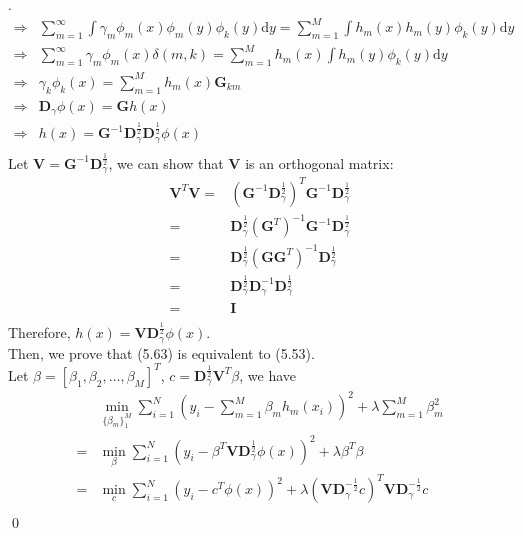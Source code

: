 \documentclass[12pt]{article}
\newenvironment{sol}
  {\par\vspace{3mm}\noindent{\it Solution}.}
  {\qed}
\begin{document}
\begin{sol}
\begin{equation*}
\begin{split}
\Longrightarrow &\sum\limits_{m=1}^{\infty}\int\gamma_m\phi_m(x)\phi_m(y)\phi_k(y)\mathrm{d}y=\sum_{m=1}^M\int h_m(x)h_m(y)\phi_k(y)\mathrm{d}y\\
\Longrightarrow &\sum\limits_{m=1}^{\infty}\gamma_m\phi_m(x)\delta(m,k)=\sum_{m=1}^Mh_m(x)\int h_m(y)\phi_k(y)\mathrm{d}y\\
\Longrightarrow &\gamma_k\phi_k(x)=\sum_{m=1}^Mh_m(x)\mathbf{G}_{km}\\
\Longrightarrow &\mathbf{D}_\gamma\phi(x)=\mathbf{G}h(x)\\
\Longrightarrow &h(x)=\mathbf{G}^{-1}\mathbf{D}_\gamma^{\frac{1}{2}}\mathbf{D}_\gamma^{\frac{1}{2}}\phi(x)\\
\end{split}
\end{equation*}
Let $\mathbf{V}=\mathbf{G}^{-1}\mathbf{D}_\gamma^{\frac{1}{2}}$, we can show that $\mathbf{V}$ is an orthogonal matrix:
\begin{equation*}
\begin{split}
\mathbf{V}^T\mathbf{V}=&(\mathbf{G}^{-1}\mathbf{D}_\gamma^{\frac{1}{2}})^T\mathbf{G}^{-1}\mathbf{D}_\gamma^{\frac{1}{2}}\\
=&\mathbf{D}_\gamma^{\frac{1}{2}}(\mathbf{G}^T)^{-1}\mathbf{G}^{-1}\mathbf{D}_\gamma^{\frac{1}{2}}\\
=&\mathbf{D}_\gamma^{\frac{1}{2}}(\mathbf{GG}^T)^{-1}\mathbf{D}_\gamma^{\frac{1}{2}}\\
=&\mathbf{D}_\gamma^{\frac{1}{2}}\mathbf{D}_\gamma^{-1}\mathbf{D}_\gamma^{\frac{1}{2}}\\
=&\mathbf{I}\\
\end{split}
\end{equation*}
Therefore, $h(x)=\mathbf{VD}_\gamma^{\frac{1}{2}}\phi(x)$.\\
Then, we prove that (5.63) is equivalent to (5.53).\\
Let $\beta = [\beta_1,\beta_2,\dots,\beta_M]^T$, $c=\mathbf{D}_\gamma^{\frac{1}{2}}\mathbf{V}^T\beta$, we have
\begin{equation*}
\begin{split}
&\min_{\{\beta_m\}_1^M}\sum_{i=1}^N\left(y_i-\sum_{m=1}^M\beta_mh_m(x_i)\right)^2+\lambda\sum_{m=1}^M\beta_m^2\\
=&\min_{\beta}\sum_{i=1}^N\left(y_i-\beta^T\mathbf{VD}_\gamma^{\frac{1}{2}}\phi(x)\right)^2+\lambda\beta^T\beta\\
=&\min_{c}\sum_{i=1}^N\left(y_i-c^T\phi(x)\right)^2+\lambda(\mathbf{VD}_\gamma^{-\frac{1}{2}}c)^T\mathbf{VD}_\gamma^{-\frac{1}{2}}c\\

\end{split}
\end{equation*}
\end{sol}
\end{document}
